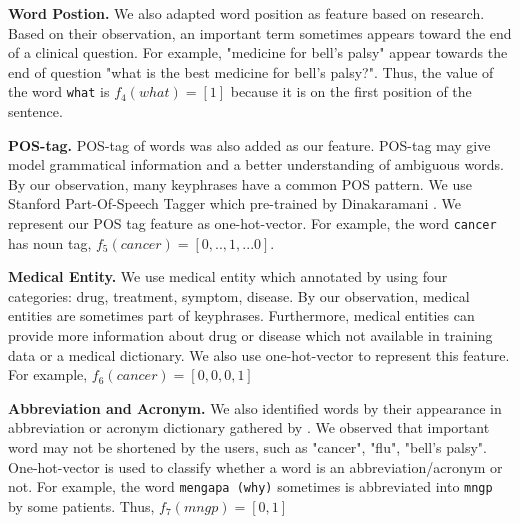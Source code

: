     \textbf{Word Postion.} We also adapted word position as feature based on \cite{cao2010automatically}research. Based on their observation, an important term sometimes appears toward the end of a clinical question. For example, "medicine for bell's palsy" appear towards the end of question "what is the best medicine for bell's palsy?". Thus, the value of the word \texttt{what} is $f_4(what) = [1]$ because it is on the first position of the sentence.
    
    \textbf{POS-tag.} POS-tag of words was also added as our feature. POS-tag may give model grammatical information and a better understanding of ambiguous words. By our observation, many keyphrases have a common POS pattern. We use Stanford Part-Of-Speech Tagger which pre-trained by Dinakaramani \cite{dinakaramani2014designing}. We represent our POS tag feature as one-hot-vector. For example, the word \texttt{cancer} has noun tag, $f_5(cancer) = [0, ..,1, ...0]$.
    
    \textbf{Medical Entity.} We use medical entity which annotated by \cite{skripsiWahid} using four categories: drug, treatment, symptom, disease. By our observation, medical entities are sometimes part of keyphrases. Furthermore, medical entities can provide more information about drug or disease which not available in training data or a medical dictionary. We also use one-hot-vector to represent this feature. For example, $f_6(cancer) = [0, 0, 0 ,1]$
    
    \textbf{Abbreviation and Acronym.} We also identified words by their appearance in abbreviation or acronym dictionary gathered by \cite{skripsiKakAbid}. We observed that important word may not be shortened by the users, such as "cancer", "flu", "bell’s palsy". One-hot-vector is used to classify whether a word is an abbreviation/acronym or not. For example, the word \texttt{mengapa (why)} sometimes is abbreviated into \texttt{mngp} by some patients. Thus, $f_7(mngp) = [0, 1]$ 
    
